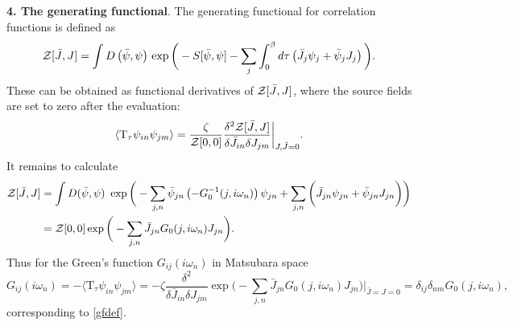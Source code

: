 \textbf{4. The generating functional}. The generating functional for correlation functions is defined as
\begin{equation*}
	\mathcal{Z}[\bar{J}, J] = \int D\left(\bar{\psi}, \psi\right) \, \exp\bigg(
		- S[\bar{\psi}, \psi] - \sum_j \int_{0}^{\beta} d \tau\left(
			\bar{J}_j \psi_j + \bar{\psi}_j J_j
		\right)
	\bigg).
\end{equation*}
These can be obtained as functional
derivatives of $\mathcal{Z}[\bar{J},J]$, where the source fields are set to zero after the evaluation:
\begin{equation*}
	\langle 
		\text{T}_\tau \psi_{in} \psi_{jm}
	\rangle = \frac{\zeta}{\mathcal{Z}[0,0]} \frac{\delta^{2} \mathcal{Z}[\bar{J},J]}{\delta \bar{J}_{in} \delta J_{jm}} \bigg|_{J, \bar{J}=0}.
\end{equation*}
It remains to calculate
\begin{align*}
	\mathcal{Z}[\bar{J},J] &= \int D(\bar{\psi}, \psi) \ \exp\bigg(
		- \sum_{j, n} \bar{\psi}_{jn} \left(-G_0^{-1}(j, i \omega_n)\right) \psi_{jn} + \sum_{j,n} \bigg(
			\bar{J}_{jn} \psi_{jn} + \bar{\psi}_{jn} J_{jn}
		\bigg)
	\bigg) 
	\\ &=  \mathcal{Z}[0,0] \exp\bigg(
		- \sum_{j,n} \bar{J}_{jn} G_0(j, i \omega_n) J_{jn}
	\bigg).
\end{align*}
Thus for the Green's function $G_{ij}(i \omega_n)$ in Matsubara space 
\begin{equation*}
	G_{ij}(i \omega_n) = -\langle 
		\text{T}_\tau \psi_{in} \psi_{jm}
	\rangle = -\zeta \frac{\delta^2}{\delta \bar{J}_{in} \delta J_{jm}} \exp\bigg(
		- \sum_{j,n} \bar{J}_{jn} G_0(j, i \omega_n) J_{jn}
	\bigg) \bigg|_{\bar{J}=J=0} = \delta_{ij} \delta_{nm} G_0(j, i \omega_n),
\end{equation*}
corresponding to \eqref{gfdef}.




